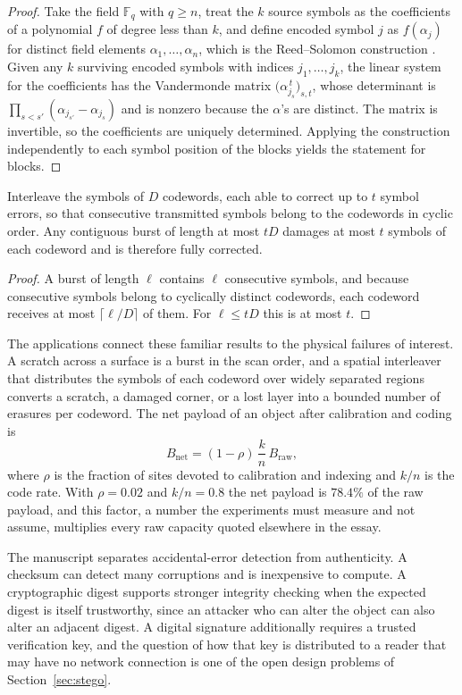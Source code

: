 \begin{proof}
Take the field $\mathbb F_q$ with $q\ge n$, treat the $k$ source symbols as the coefficients of a polynomial $f$ of degree less than $k$, and define encoded symbol $j$ as $f(\alpha_j)$ for distinct field elements $\alpha_1,\dots,\alpha_n$, which is the Reed--Solomon construction \cite{reed1960}. Given any $k$ surviving encoded symbols with indices $j_1,\dots,j_k$, the linear system for the coefficients has the Vandermonde matrix $\bigl(\alpha_{j_s}^{\,t}\bigr)_{s,t}$, whose determinant is $\prod_{s<s'}(\alpha_{j_{s'}}-\alpha_{j_s})$ and is nonzero because the $\alpha$'s are distinct. The matrix is invertible, so the coefficients are uniquely determined. Applying the construction independently to each symbol position of the blocks yields the statement for blocks.
\end{proof}

\begin{proposition}\label{prop:burst}
Interleave the symbols of $D$ codewords, each able to correct up to $t$ symbol errors, so that consecutive transmitted symbols belong to the codewords in cyclic order. Any contiguous burst of length at most $tD$ damages at most $t$ symbols of each codeword and is therefore fully corrected.
\end{proposition}

\begin{proof}
A burst of length $\ell$ contains $\ell$ consecutive symbols, and because consecutive symbols belong to cyclically distinct codewords, each codeword receives at most $\lceil\ell/D\rceil$ of them. For $\ell\le tD$ this is at most $t$.
\end{proof}

The applications connect these familiar results to the physical failures of interest. A scratch across a surface is a burst in the scan order, and a spatial interleaver that distributes the symbols of each codeword over widely separated regions converts a scratch, a damaged corner, or a lost layer into a bounded number of erasures per codeword. The net payload of an object after calibration and coding is
\begin{equation}\label{eq:net}
B_{\mathrm{net}}=(1-\rho)\,\frac{k}{n}\,B_{\mathrm{raw}},
\end{equation}
where $\rho$ is the fraction of sites devoted to calibration and indexing and $k/n$ is the code rate. With $\rho=0.02$ and $k/n=0.8$ the net payload is $78.4\%$ of the raw payload, and this factor, a number the experiments must measure and not assume, multiplies every raw capacity quoted elsewhere in the essay.

The manuscript separates accidental-error detection from authenticity. A checksum can detect many corruptions and is inexpensive to compute. A cryptographic digest supports stronger integrity checking when the expected digest is itself trustworthy, since an attacker who can alter the object can also alter an adjacent digest. A digital signature additionally requires a trusted verification key, and the question of how that key is distributed to a reader that may have no network connection is one of the open design problems of Section~\ref{sec:stego}.
